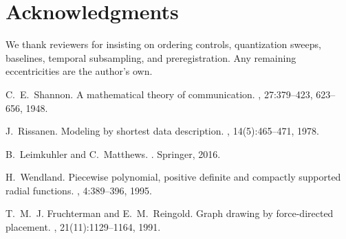 \documentclass[11pt,a4paper]{article}
\numberwithin{equation}{section}
\begin{document}
\section*{Acknowledgments}
We thank reviewers for insisting on ordering controls, quantization sweeps, baselines, temporal subsampling, and preregistration.  
Any remaining eccentricities are the author’s own.


\begin{thebibliography}{10}

C.~E.~Shannon.
\newblock A mathematical theory of communication.
, 27:379--423, 623--656, 1948.

J.~Rissanen.
\newblock Modeling by shortest data description.
, 14(5):465--471, 1978.

B.~Leimkuhler and C.~Matthews.
.
\newblock Springer, 2016.

H.~Wendland.
\newblock Piecewise polynomial, positive definite and compactly supported radial functions.
, 4:389--396, 1995.

T.~M.~J. Fruchterman and E.~M.~Reingold.
\newblock Graph drawing by force-directed placement.
, 21(11):1129--1164, 1991.

\end{thebibliography}
\end{document}
